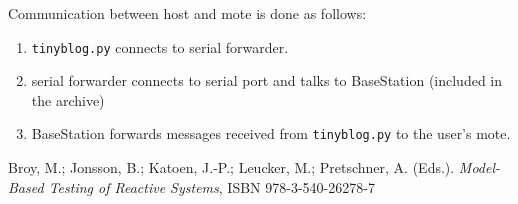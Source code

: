\documentclass[english,11pt]{article}
\numberwithin{equation}{section}
\begin{document}
Communication between host and mote is done as follows:
\begin{enumerate}
    \item \texttt{tinyblog.py} connects to serial forwarder.
    \item serial forwarder connects to serial port and talks to BaseStation
        (included in the archive)
    \item BaseStation forwards messages received from \texttt{tinyblog.py} to
        the user's mote.
\end{enumerate}

\begin{thebibliography}{9}


        Broy, M.; Jonsson, B.; Katoen, J.-P.; Leucker, M.; Pretschner, A.
        (Eds.). \emph{Model-Based Testing of Reactive Systems}, ISBN
        978-3-540-26278-7

\end{thebibliography}
\end{document}
